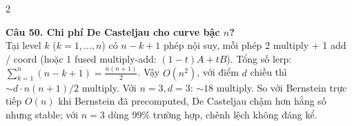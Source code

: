 \begin{paracol}{2}
\switchcolumn

\textbf{Câu 50. Chi phí De Casteljau cho curve bậc $n$?}\\
Tại level $k$ ($k=1,\ldots,n$) có $n-k+1$ phép nội suy, mỗi phép 2 multiply + 1 add / coord (hoặc 1 fused multiply-add: $(1-t)A + tB$). Tổng số lerp: $\sum_{k=1}^{n} (n-k+1) = \tfrac{n(n+1)}{2}$. Vậy \textbf{$O(n^2)$}, với điểm $d$ chiều thì $\sim d \cdot n(n+1)/2$ multiply. Với $n=3, d=3$: $\sim 18$ multiply. So với Bernstein trực tiếp $O(n)$ khi Bernstein đã precomputed, De Casteljau chậm hơn hằng số nhưng stable; với $n=3$ dùng 99\% trường hợp, chênh lệch không đáng kể.

\end{paracol}
